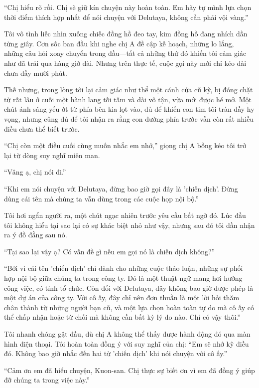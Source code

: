 \documentclass[../main.tex]{subfiles}
\begin{document}
``Chị hiểu rõ rồi. Chị sẽ giữ kín chuyện này hoàn toàn. Em hãy tự mình lựa chọn thời điểm thích hợp nhất để nói chuyện với Delutaya, không cần phải vội vàng.''

Tôi vô tình liếc nhìn xuống chiếc đồng hồ đeo tay, kim đồng hồ đang nhích dần từng giây. Cơn sốc ban đầu khi nghe chị A đề cập kế hoạch, những lo lắng, những câu hỏi xoay chuyển trong đầu—tất cả những thứ đó khiến tôi cảm giác như đã trải qua hàng giờ dài. Nhưng trên thực tế, cuộc gọi này mới chỉ kéo dài chưa đầy mười phút.

Thế nhưng, trong lòng tôi lại cảm giác như thể một cánh cửa cũ kỹ, bị đóng chặt từ rất lâu ở cuối một hành lang tối tăm và dài vô tận, vừa mới được hé mở. Một chút ánh sáng yếu ớt từ phía bên kia lọt vào, đủ để khiến con tim tôi tràn đầy hy vọng, nhưng cũng đủ để tôi nhận ra rằng con đường phía trước vẫn còn rất nhiều điều chưa thể biết trước.

\ct

``Chị còn một điều cuối cùng muốn nhắc em nhớ,'' giọng chị A bỗng kéo tôi trở lại từ dòng suy nghĩ miên man.

``Vâng ạ, chị nói đi.''

``Khi em nói chuyện với Delutaya, đừng bao giờ gọi đây là 'chiến dịch'. Đừng dùng cái tên mà chúng ta vẫn dùng trong các cuộc họp nội bộ.''

Tôi hơi ngẩn người ra, một chút ngạc nhiên trước yêu cầu bất ngờ đó. Lúc đầu tôi không hiểu tại sao lại có sự khác biệt nhỏ như vậy, nhưng sau đó tôi dần nhận ra ý đồ đằng sau nó.

``Tại sao lại vậy ạ? Có vấn đề gì nếu em gọi nó là chiến dịch không?''

``Bởi vì cái tên 'chiến dịch' chỉ dành cho những cuộc thảo luận, những sự phối hợp nội bộ giữa chúng ta trong công ty. Đó là một thuật ngữ mang hơi hướng công việc, có tính tổ chức. Còn đối với Delutaya, đây không bao giờ được phép là một dự án của công ty. Với cô ấy, đây chỉ nên đơn thuần là một lời hỏi thăm chân thành từ những người bạn cũ, và một lựa chọn hoàn toàn tự do mà cô ấy có thể chấp nhận hoặc từ chối mà không cần bất kỳ lý do nào. Chỉ có vậy thôi.''

Tôi nhanh chóng gật đầu, dù chị A không thể thấy được hành động đó qua màn hình điện thoại. Tôi hoàn toàn đồng ý với suy nghĩ của chị: ``Em sẽ nhớ kỹ điều đó. Không bao giờ nhắc đến hai từ 'chiến dịch' khi nói chuyện với cô ấy.''

``Cảm ơn em đã hiểu chuyện, Kuon-san. Chị thực sự biết ơn vì em đã đồng ý giúp đỡ chúng ta trong việc này.''
\end{document}

